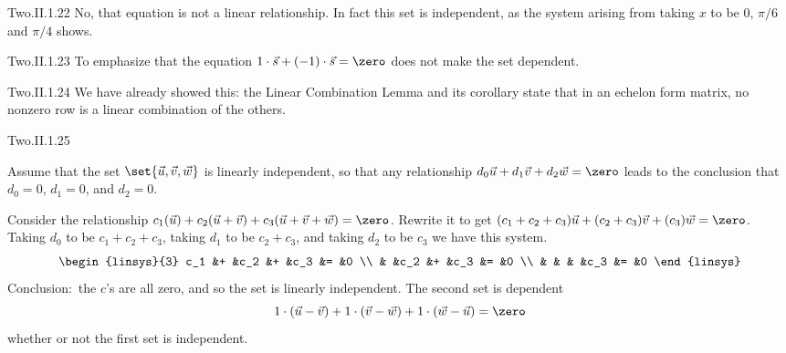 \begin{ans}{Two.II.1.22}
      No, that equation is not a linear relationship.
      In fact this set is independent, as the system arising from taking
      \( x \) to be \( 0 \), \( \pi/6 \) and \( \pi/4 \) shows.
    
\end{ans}
\begin{ans}{Two.II.1.23}
      To emphasize that the equation
      \( 1\cdot\vec{s}+(-1)\cdot\vec{s}=\zero \)
      does not make the set dependent.
    
\end{ans}
\begin{ans}{Two.II.1.24}
      We have already showed this: the Linear Combination
      Lemma and its corollary state that in an echelon form matrix,
      no nonzero row is a linear combination of the others.
    
\end{ans}
\begin{ans}{Two.II.1.25}
       \begin{exparts}
         \partsitem Assume that the set
           \( \set{\vec{u},\vec{v},\vec{w}} \) is linearly
           independent, so that any relationship
           $d_0\vec{u}+d_1\vec{v}+d_2\vec{w}=\zero$ leads to the conclusion
           that $d_0=0$, $d_1=0$, and $d_2=0$.

           Consider the relationship
           \( c_1(\vec{u})+c_2(\vec{u}+\vec{v})+c_3(\vec{u}+\vec{v}+\vec{w})
           =\zero \).
           Rewrite it to get
           \( (c_1+c_2+c_3)\vec{u}+(c_2+c_3)\vec{v}+(c_3)\vec{w}=\zero \).
           Taking $d_0$ to be $c_1+c_2+c_3$, taking $d_1$ to be $c_2+c_3$,
           and taking $d_2$ to be $c_3$ we have this system.
           \begin{equation*}
             \begin{linsys}{3}
               c_1  &+  &c_2  &+  &c_3  &=  &0  \\
                    &   &c_2  &+  &c_3  &=  &0  \\
                    &   &     &   &c_3  &=  &0
             \end{linsys}
           \end{equation*}
           Conclusion:~the $c$'s are all zero, and so the set is linearly
           independent.
        \partsitem The second set is dependent
           \begin{equation*}
             1\cdot(\vec{u}-\vec{v})
             +1\cdot(\vec{v}-\vec{w})
             +1\cdot(\vec{w}-\vec{u})
             =\zero
           \end{equation*}
           whether or not the first set is independent.
      \end{exparts}
    
\end{ans}
